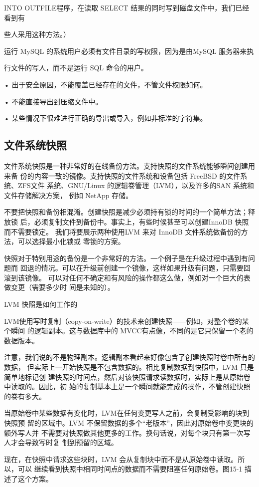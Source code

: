 INTO OUTFILE程序，在读取 SELECT 结果的同时写到磁盘文件中，我们已经看到有

些人采用这种方法。）

运行 MySQL 的系统用户必须有文件目录的写权限，因为是由MySQL 服务器来执

行文件的写人，而不是运行 SQL 命令的用户。

• 出于安全原因，不能覆盖已经存在的文件，不管文件权限如何。

• 不能直接导出到压缩文件中。

• 某些情况下很难进行正确的导出或导入，例如非标准的字符集。

\subsection{文件系统快照}
文件系统快照是一种非常好的在线备份方法。支持快照的文件系统能够瞬间创建用来备
份的内容一致的镜像。支持快照的文件系统和设备包括 FreeBSD 的文件系统、ZFS文件
系统、GNU/Linux 的逻辑卷管理（LVM），以及许多的SAN 系统和文件存储解决方案，
例如 NetApp 存储。

不要把快照和备份相混淆。创建快照是减少必须持有锁的时间的一个简单方法；释放锁
后，必须复制文件到备份中。事实上，有些时候甚至可以创建InnoDB 快照而不需要锁定。
我们将要展示两种使用LVM 来对 InnoDB 文件系统做备份的方法，可以选择最小化锁或
零锁的方案。

快照对于特别用途的备份是一个非常好的方法。一个例子是在升级过程中遇到有问题而
回退的情况。可以在升级前创建一个镜像，这样如果升级有问题，只需要回滚到该镜像。
可以对任何不确定和有风险的操作都这么做，例如对一个巨大的表做变更（需要多少时
间是未知的）。

LVM 快照是如何工作的

LVM使用写时复制（copy-on-write）的技术来创建快照——例如，对整个卷的某个瞬间
的逻辑副本。这与数据库中的 MVCC有点像，不同的是它只保留一个老的数据版本。

注意，我们说的不是物理副本。逻辑副本看起来好像包含了创建快照时卷中所有的数据，
但实际上一开始快照是不包含数据的。相比复制数据到快照中，LVM 只是简单地标记创
建快照的时间点，然后对该快照请求读数据时，实际上是从原始卷中读取的。因此，初
始的复制基本上是一个瞬间就能完成的操作，不管创建快照的卷有多大。

当原始卷中某些数据有变化时，LVM在任何变更写人之前，会复制受影响的块到快照预
留的区域中。LVM 不保留数据的多个“老版本”，因此对原始卷中变更块的额外写人并
不需要对快照做其他更多的工作。换句话说，对每个块只有第一次写人才会导致写时复
制到预留的区域。

现在，在快照中请求这些块时，LVM 会从复制块中而不是从原始卷中读取。所以，可以
继续看到快照中相同时间点的数据而不需要阻塞任何原始卷。图15-1 描述了这个方案。

